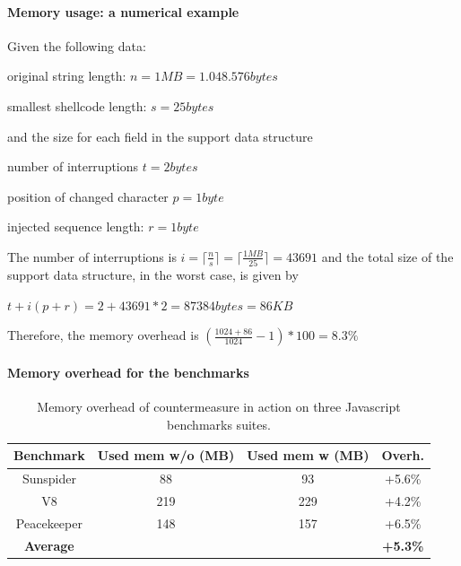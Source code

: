 \paragraph{Memory usage: a numerical example}

Given the following data:
\begin{description}
\item original string length:  $n = 1 MB = 1.048.576 bytes$ 
\item smallest shellcode length: $s = 25 bytes$ 
\end{description}

and the size for each field in the support data structure 
\begin{description}
\item number of interruptions $t = 2 bytes $
\item position of changed character $p=1 byte$
\item injected sequence length:  $r = 1  byte$ 
\end{description}

The number of interruptions is $i= \lceil \frac{n}{s} \rceil = \lceil \frac{1MB}{25} \rceil= 43691$ and the total size of the support data structure, in the worst case, is given by

$ t + i(p+r) = 2 + 43691*2 = 87384 bytes = 86KB $


Therefore, the memory overhead is $(\frac{1024 + 86}{1024} - 1)*100 = 8.3\% $

\paragraph{Memory overhead for the benchmarks}
\begin{table}[htdp]
\begin{center}
\begin{tabular}{|c|c|c|c|}
\hline
\bf{Benchmark} & \bf{Used mem w/o (MB)} & \bf{Used mem w (MB)}  & \bf{Overh.} \\
\hline
Sunspider   &    88      &    93      &  +5.6\% \\
V8          &    219     &    229     &  +4.2\% \\
Peacekeeper &    148     &    157     &  +6.5\% \\
\hline
\bf{Average}  &   &   & \bf{+5.3\%} \\
\hline
\end{tabular}
\end{center}
\caption{{ Memory overhead of countermeasure in action on three Javascript benchmarks suites.}}
\vspace{0.3cm}
\label{memory}
\end{table}


